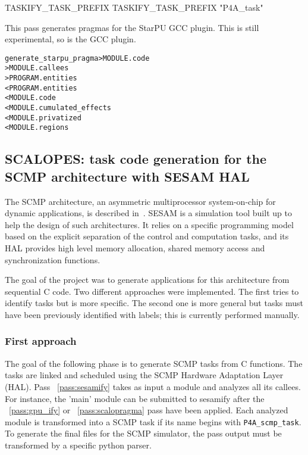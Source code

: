 \documentclass[a4paper]{report}
\newenvironment{PipsMake}{\begin{alltt}}{\end{alltt}}
\newcommand{\PipsPassRef}[1]{\texttt{\detokenize{#1}}~\ref{pass:#1}}
\newenvironment{PipsPass}[1]{\label{pass:#1}}{}
\begin{document}
\begin{PipsProp}{TASKIFY_TASK_PREFIX}
TASKIFY_TASK_PREFIX "P4A_task"
\end{PipsProp}



\begin{PipsPass}{generate_starpu_pragma}
This pass generates pragmas for the StarPU GCC plugin. This is still 
experimental, so is the GCC plugin.
\end{PipsPass}
\begin{PipsMake}
generate_starpu_pragma         > MODULE.code
                               > MODULE.callees
                               > PROGRAM.entities
               < PROGRAM.entities
               < MODULE.code
               < MODULE.cumulated_effects
               < MODULE.privatized
               < MODULE.regions
\end{PipsMake}



\subsection{SCALOPES: task code generation for the SCMP architecture with SESAM HAL}
\label{subsection-scalopes-project}

The SCMP architecture, an asymmetric multiprocessor system-on-chip for
dynamic applications, is described in~\cite{Ventroux2010}. SESAM is a
simulation tool built up to help the design of such architectures. It
relies on a specific programming model based on the explicit
separation of the control and computation tasks, and its HAL provides
high level memory allocation, shared memory access and synchronization
functions.

The goal of the project was to generate applications for this
architecture from sequential C code. Two different approaches were
implemented. The first tries to identify tasks but is more
specific. The second one is more general but tasks must have been
previously identified with labels; this is currently performed
manually.

\subsubsection{First approach}

The goal of the following phase is to generate SCMP tasks from C
functions. The tasks are linked and scheduled using the SCMP Hardware
Adaptation Layer (HAL). Pass \PipsPassRef{sesamify} takes as input a
module and analyzes all its callees. For instance, the 'main' module
can be submitted to sesamify after the \PipsPassRef{gpu_ify} or
\PipsPassRef{scalopragma} pass have been applied. Each analyzed module
is transformed into a SCMP task if its name begins with
\texttt{P4A\_scmp\_task}. To generate the final files for the SCMP
simulator, the pass output must be transformed by a specific python
parser.
\end{document}
